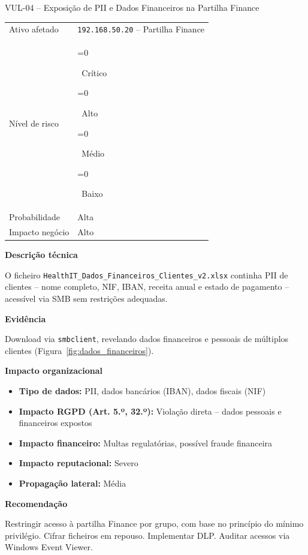 \documentclass[12pt, a4paper]{report}
\newcommand{\risk}[1]{%
  \ifnum\pdfstrcmp{#1}{Critico}=0{\colorbox{Critical}{\color{white}\bfseries\footnotesize\strut~Crítico~}}\fi
  \ifnum\pdfstrcmp{#1}{Alto}=0{\colorbox{High}{\color{white}\bfseries\footnotesize\strut~Alto~}}\fi
  \ifnum\pdfstrcmp{#1}{Medio}=0{\colorbox{Medium}{\color{black}\bfseries\footnotesize\strut~Médio~}}\fi
  \ifnum\pdfstrcmp{#1}{Baixo}=0{\colorbox{Low}{\color{white}\bfseries\footnotesize\strut~Baixo~}}\fi}
\begin{document}
\vspace{0.8em}

\begin{finding}{VUL-04 -- Exposição de PII e Dados Financeiros na Partilha Finance}
\begin{tabular}{@{}ll@{}}
  \small\color{TextGray}Ativo afetado   & \texttt{192.168.50.20} -- Partilha Finance \\[3pt]
  \small\color{TextGray}Nível de risco  & \risk{Critico} \\[3pt]
  \small\color{TextGray}Probabilidade   & Alta \\[3pt]
  \small\color{TextGray}Impacto negócio & Alto \\
\end{tabular}

\vspace{8pt}\textbf{Descrição técnica}

O ficheiro \texttt{HealthIT\_Dados\_Financeiros\_Clientes\_v2.xlsx} continha PII de clientes
-- nome completo, NIF, IBAN, receita anual e estado de pagamento -- acessível via SMB sem
restrições adequadas.

\vspace{6pt}\textbf{Evidência}

Download via \texttt{smbclient}, revelando dados financeiros e pessoais de múltiplos clientes
(Figura~\ref{fig:dados_financeiros}).

\vspace{4pt}\textbf{Impacto organizacional}
\begin{itemize}[itemsep=1pt]
  \item \textbf{Tipo de dados:} PII, dados bancários (IBAN), dados fiscais (NIF)
  \item \textbf{Impacto RGPD (Art. 5.º, 32.º):} Violação direta -- dados pessoais e financeiros expostos
  \item \textbf{Impacto financeiro:} Multas regulatórias, possível fraude financeira
  \item \textbf{Impacto reputacional:} Severo
  \item \textbf{Propagação lateral:} Média
\end{itemize}

\vspace{4pt}\textbf{Recomendação}

Restringir acesso à partilha Finance por grupo, com base no princípio do mínimo privilégio.
Cifrar ficheiros em repouso. Implementar DLP. Auditar acessos via Windows Event Viewer.
\end{finding}
\end{document}
